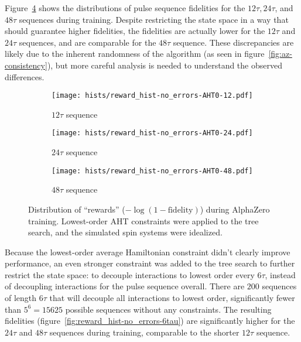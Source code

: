 Figure~\ref{fig:reward_hist-no_errors-AHT0} shows the distributions of pulse sequence fidelities for the $12\tau, 24\tau$, and $48\tau$ sequences during training. Despite restricting the state space in a way that should guarantee higher fidelities, the fidelities are actually lower for the $12\tau$ and $24\tau$ sequences, and are comparable for the $48\tau$ sequence. These discrepancies are likely due to the inherent randomness of the algorithm (as seen in figure~\ref{fig:az-consistency}), but more careful analysis is needed to understand the observed differences.

\begin{figure}[H]
    \centering
    \begin{subfigure}{.49\textwidth}
        \centering
        \texttt{[image: hists/reward\_hist-no\_errors-AHT0-12.pdf]}
        \caption{$12\tau$ sequence}
        \label{fig:reward_hist-no_errors-AHT0-12}
    \end{subfigure}
    \begin{subfigure}{.49\textwidth}
        \centering
        \texttt{[image: hists/reward\_hist-no\_errors-AHT0-24.pdf]}
        \caption{$24\tau$ sequence}
        \label{fig:reward_hist-no_errors-AHT0-24}
    \end{subfigure}
    \begin{subfigure}{.49\textwidth}
        \centering
        \texttt{[image: hists/reward\_hist-no\_errors-AHT0-48.pdf]}
        \caption{$48\tau$ sequence}
        \label{fig:reward_hist-no_errors-AHT0-48}
    \end{subfigure}
    \caption{Distribution of ``rewards'' ($-\log(1 - \text{fidelity})$) during AlphaZero training. Lowest-order AHT constraints were applied to the tree search, and the simulated spin systems were idealized.}
    \label{fig:reward_hist-no_errors-AHT0}
\end{figure}


Because the lowest-order average Hamiltonian constraint didn't clearly improve performance, an even stronger constraint was added to the tree search to further restrict the state space: to decouple interactions to lowest order every $6\tau$, instead of decoupling interactions for the pulse sequence overall.
There are $200$ sequences of length $6\tau$ that will decouple all interactions to lowest order, significantly fewer than $5^6 = 15625$ possible sequences without any constraints. The resulting fidelities (figure~\ref{fig:reward_hist-no_errors-6tau}) are significantly higher for the $24\tau$ and $48\tau$ sequences during training, comparable to the shorter $12\tau$ sequence.

